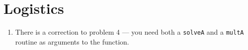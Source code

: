 \section{Logistics}

\begin{enumerate}
\item There is a correction to problem 4 --- you need both a {\tt solveA}
  and a {\tt multA} routine as arguments to the function.
\end{enumerate}
